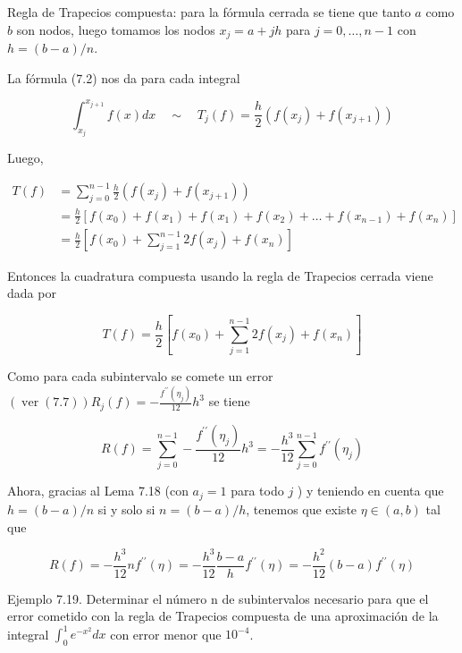 \documentclass[10pt]{article}
\begin{document}
Regla de Trapecios compuesta: para la fórmula cerrada se tiene que tanto $a$ como $b$ son nodos, luego tomamos los nodos $x_{j}=a+j h$ para $j=0, \ldots, n-1$ con $h=(b-a) / n$.

La fórmula (7.2) nos da para cada integral

$$
\int_{x_{j}}^{x_{j+1}} f(x) d x \quad \sim \quad T_{j}(f)=\frac{h}{2}\left(f\left(x_{j}\right)+f\left(x_{j+1}\right)\right)
$$

Luego,

$$
\begin{aligned}
T(f) & =\sum_{j=0}^{n-1} \frac{h}{2}\left(f\left(x_{j}\right)+f\left(x_{j+1}\right)\right) \\
& =\frac{h}{2}\left[f\left(x_{0}\right)+f\left(x_{1}\right)+f\left(x_{1}\right)+f\left(x_{2}\right)+\ldots+f\left(x_{n-1}\right)+f\left(x_{n}\right)\right] \\
& =\frac{h}{2}\left[f\left(x_{0}\right)+\sum_{j=1}^{n-1} 2 f\left(x_{j}\right)+f\left(x_{n}\right)\right]
\end{aligned}
$$

Entonces la cuadratura compuesta usando la regla de Trapecios cerrada viene dada por


\begin{equation*}
T(f)=\frac{h}{2}\left[f\left(x_{0}\right)+\sum_{j=1}^{n-1} 2 f\left(x_{j}\right)+f\left(x_{n}\right)\right] \tag{7.10}
\end{equation*}


Como para cada subintervalo se comete un error $(\operatorname{ver}(7.7)) R_{j}(f)=-\frac{f^{\prime \prime}\left(\eta_{j}\right)}{12} h^{3}$ se tiene

$$
R(f)=\sum_{j=0}^{n-1}-\frac{f^{\prime \prime}\left(\eta_{j}\right)}{12} h^{3}=-\frac{h^{3}}{12} \sum_{j=0}^{n-1} f^{\prime \prime}\left(\eta_{j}\right)
$$

Ahora, gracias al Lema 7.18 (con $a_{j}=1$ para todo $j$ ) y teniendo en cuenta que $h=(b-a) / n$ si y solo si $n=(b-a) / h$, tenemos que existe $\eta \in(a, b)$ tal que


\begin{equation*}
R(f)=-\frac{h^{3}}{12} n f^{\prime \prime}(\eta)=-\frac{h^{3}}{12} \frac{b-a}{h} f^{\prime \prime}(\eta)=-\frac{h^{2}}{12}(b-a) f^{\prime \prime}(\eta) \tag{7.11}
\end{equation*}


Ejemplo 7.19. Determinar el número n de subintervalos necesario para que el error cometido con la regla de Trapecios compuesta de una aproximación de la integral $\int_{0}^{1} e^{-x^{2}} d x$ con error menor que $10^{-4}$.
\end{document}
